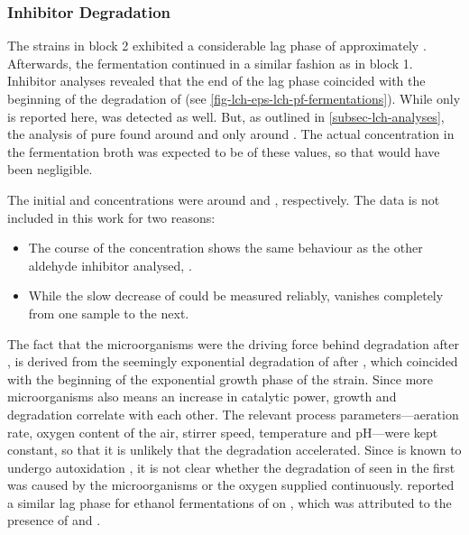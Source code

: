 \subsubsection{Inhibitor Degradation\label{subsubsec-lch-eps-disc-lch-pf-inh-degradation}}
The strains in block 2 exhibited a considerable lag phase of approximately . Afterwards, the fermentation continued in a similar fashion as in block 1. Inhibitor analyses revealed that the end of the lag phase coincided with the beginning of the degradation of \fur{} (see \vref{fig-lch-eps-lch-pf-fermentations}). While only \fur{} is reported here, \hmf{} was detected as well. But, as outlined in \vref{subsec-lch-analyses}, the analysis of pure \lch{} found around  \fur{} and only around  \hmf{}. The actual concentration in the fermentation broth was expected to be  of these values, so that \hmf{} would have been negligible.

The initial \fur{} and \hmf{} concentrations were around  and , respectively. The \hmf{} data is not included in this work for two reasons:
\begin{itemize}
	\item The course of the \hmf{} concentration shows the same behaviour as the other aldehyde inhibitor analysed, \fur{}.
	\item While the slow decrease of \fur{} could be measured reliably, \hmf{} vanishes completely from one sample to the next.
\end{itemize}

The fact that the microorganisms were the driving force behind \fur{} degradation after , is derived from the seemingly exponential degradation of \fur{} after , which coincided with the beginning of the exponential growth phase of the strain. Since more microorganisms also means an increase in catalytic power, growth and \fur{} degradation correlate with each other. The relevant process parameters---aeration rate, oxygen content of the air, stirrer speed, temperature and pH---were kept constant, so that it is unlikely that the \fur{} degradation accelerated. Since \fur{} is known to undergo autoxidation \cite{Dunlop1946, Dunlop1948}, it is not clear whether the degradation of \fur{} seen in the first  was caused by the microorganisms or the oxygen supplied continuously. \textcite{Liu2004} reported a similar lag phase for ethanol fermentations of  on \lch{}, which was attributed to the presence of \fur{} and \hmf{} \cite{Almeida2007}.

